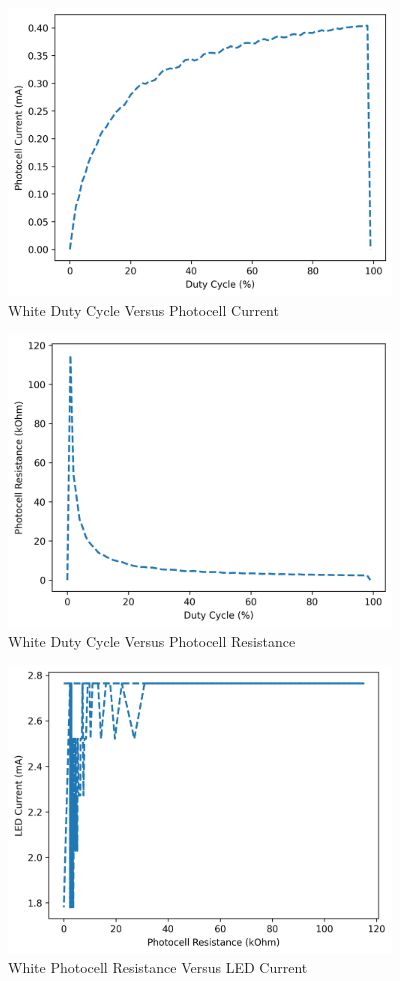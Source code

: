 \documentclass[12pt,titlepage]{article}
\begin{document}
\begin{figure}[!htb]
    \centering
    \includegraphics[width=4in]{lab_4/white_duty_cycle_photo_curr.png}
    \caption{White Duty Cycle Versus Photocell Current}\label{fig:white_lab_4_duty_cycle_photo_curr}
\end{figure}
\begin{figure}[!htb]
  \centering
  \includegraphics[width=4in]{lab_4/white_duty_cycle_photo_res.png}
  \caption{White Duty Cycle Versus Photocell Resistance}\label{fig:white_lab_4_duty_cycle_photo_res}
\end{figure}
\begin{figure}[!htb]
    \centering
    \includegraphics[width=4in]{lab_4/white_photo_res_led_curr.png}
    \caption{White Photocell Resistance Versus LED Current}\label{fig:white_lab_4_photo_res_led_curr}
\end{figure}
\end{document}
